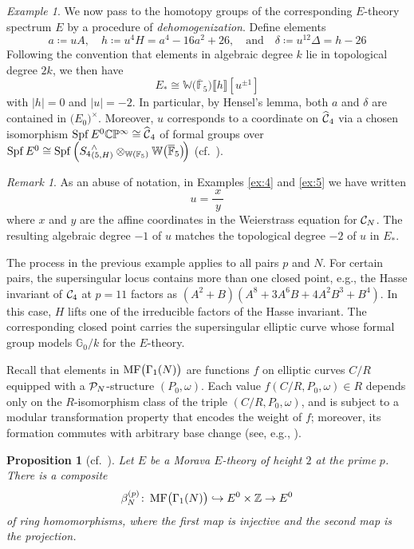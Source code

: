 \documentclass{gtpart}
\newtheorem{prop}[equation]{Proposition}
\theoremstyle{definition}
\theoremstyle{remark}
\newtheorem{rmk}[equation]{Remark}
\newtheorem{ex}[equation]{Example}
\def\co{\colon\thinspace}
\newcommand{\mb}[1]{\mathbb{#1}}
\newcommand{\Spf}{{\rm Spf\thinspace}}
\newcommand{\cF}{\overline {\mb F}}
\newcommand{\CC}{{\cal C}}
\newcommand{\CP}{{\cal P}}
\newcommand{\BC}{{\mb C}}
\newcommand{\BF}{{\mb F}}
\newcommand{\BG}{{\mb G}}
\newcommand{\BP}{{\mb P}}
\newcommand{\BW}{{\mb W}}
\newcommand{\BZ}{{\mb Z}}
\newcommand{\HCC}{\widehat{~\!\!\CC}}
\newcommand{\ad}{\text{and}}
\newcommand{\MF}{{\rm MF}}
\newcommand{\B}{\beta}
\renewcommand{\D}{\Delta}
\renewcommand{\d}{\delta}
\newcommand{\G}{\Gamma}
\newcommand{\ce}{\coloneqq}
\newcommand{\lb}{\llbracket}
\newcommand{\rb}{\rrbracket}
\renewcommand{\=}{\approx}
\renewcommand{\-}{\sim}
\numberwithin{equation}{section}
\begin{document}
\begin{ex}
 We now pass to the homotopy groups of the corresponding $E$-theory spectrum 
 $E$ by a procedure of {\em dehomogenization}.  Define elements 
 \[
  a \ce u A, \quad h \ce u^4 H = a^4 - 16 a^2 + 26, \quad \ad \quad \d \ce 
  u^{12} \D = h - 26 
 \]
 Following the convention that elements in algebraic degree $k$ lie in 
 topological degree $2 k$, we then have 
 \[
  E_* \cong \BW \big( \cF_5 \big) \lb h \rb [u^{\pm 1}] 
 \]
 with $|h| = 0$ and $|u| = -2$.  In particular, by Hensel's lemma, both $a$ and 
 $\d$ are contained in $\big( E_0 \big)^{\!\times}$.  Moreover, $u$ corresponds 
 to a coordinate on $\HCC_4$ via a chosen isomorphism 
 $\Spf E^0 \BC\BP^\infty \cong \HCC_4$ of formal groups over $\Spf E^0 \cong 
 \Spf\!\left( {S_4}^\wedge_{(5,H)} \otimes_{\BW(\BF_5)} 
 \BW \big( \cF_5 \big) \!\right)$ (cf.~\cite[Definition 1.2]{AHS01}).  
\end{ex}

\begin{rmk}
 \label{rmk:abuse}
 As an abuse of notation, in Examples \ref{ex:4} and \ref{ex:5} we have written 
 \[
  u = \frac{~\!x~\!}{y} 
 \]
 where $x$ and $y$ are the affine coordinates in the Weierstrass equation for 
 $\CC_N$.  The resulting algebraic degree $-1$ of $u$ matches the topological 
 degree $-2$ of $u$ in $E_*$.  
\end{rmk}

The process in the previous example applies to all pairs $p$ and $N$.  For 
certain pairs, the supersingular locus contains more than one closed point, 
e.g., the Hasse invariant of $\CC_4$ at $p = 11$ factors as 
$(A^2 + B) (A^8 + 3 A^6 B + 4 A^2 B^3 + B^4)$.  In this case, $H$ lifts one of 
the irreducible factors of the Hasse invariant.  The corresponding closed point 
carries the supersingular elliptic curve whose formal group models $\BG_0 / k$ 
for the $E$-theory.  

Recall that elements in $\MF\big(\G_1(N)\big)$ are functions $f$ on elliptic 
curves $C/R$ equipped with a $\CP_N$-structure $(P_0,\omega)$.  Each value 
$f(C/R, P_0, \omega) \in R$ depends only on the $R$-isomorphism class of the 
triple $(C/R, P_0, \omega)$, and is subject to a modular transformation property 
that encodes the weight of $f$; moreover, its formation commutes with arbitrary 
base change (see, e.g., \cite[Section 1.2]{padicprop}).  

\begin{prop}[cf.~{\cite[Lemma 6.3]{BOSS}}]
 \label{prop:mfe0}
 Let $E$ be a Morava $E$-theory of height $2$ at the prime $p$.  There is a 
 composite 
 \[
  \B_N^{(p)} \co \MF\big(\G_1(N)\big) \hookrightarrow E^0 \times \BZ \to E^0 
 \]
 of ring homomorphisms, where the first map is injective and the second map is 
 the projection.  
\end{prop}
\end{document}
